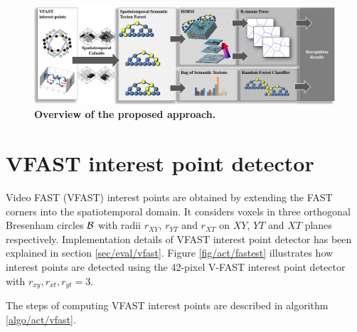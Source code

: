 \begin{figure}[ht]
	\centering  	
	\includegraphics[width=1.0\linewidth]{fig/act/fig1_new4.pdf}
	\caption{\textbf{Overview of the proposed approach.}}
	\label{fig/act/flow}
\end{figure}

\section{VFAST interest point detector}
\label{sec/act/fastest}
Video FAST (VFAST) interest points are obtained by extending the FAST corners \cite{Rosten2006} into the spatiotemporal domain. It considers voxels in three orthogonal Bresenham circles $\mathcal{B}$ with radii $r_{XY}$, $r_{YT}$ and $r_{XT}$ on $XY$, $YT$ and $XT$ planes respectively. Implementation details of VFAST interest point detector has been explained in section \ref{sec/eval/vfast}. Figure \ref{fig/act/fastest} illustrates how interest points are detected using the 42-pixel V-FAST interest point detector with $r_{xy},r_{xt},r_{yt} = 3$. 

\iffalse
The steps of computing VFAST interest points are described in algorithm \ref{algo/act/vfast}.

